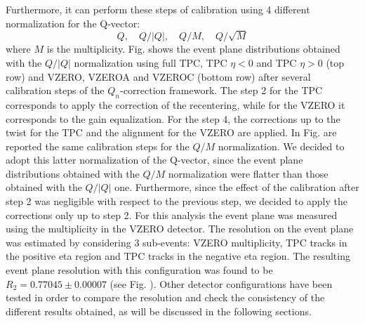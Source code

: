 Furthermore, it can perform these steps of calibration using 4 different normalization for the Q-vector:
\begin{equation}
Q, \quad Q/|Q|, \quad Q/M, \quad Q/\sqrt{M}
\end{equation}
where $M$ is the multiplicity.
Fig.  shows the event plane
distributions obtained with the $Q/|Q|$ normalization using full TPC, TPC $\eta<0$ and TPC $\eta>0$ (top row) and VZERO, VZEROA and VZEROC (bottom row) after several calibration steps of the $Q_n$-correction framework. The step 2 for the TPC  corresponds to apply the correction of the recentering, while for the VZERO it corresponds to the gain equalization. For the step 4, the corrections up to the twist for the TPC and the alignment for the VZERO are applied. In Fig. are reported the same calibration steps for the $Q/M$ normalization. We decided to adopt this latter normalization of the Q-vector, since the event plane distributions obtained with the $Q/M$ normalization were flatter than those obtained with the $Q/|Q|$ one. Furthermore, since the effect of the calibration after step 2 was negligible with respect to the previous step, we decided to apply the corrections only up to step 2.
For this analysis the event plane was measured using the multiplicity in the VZERO detector. The resolution on the event plane was estimated by considering 3 sub-events: VZERO multiplicity, TPC tracks in the positive eta region and TPC tracks in the negative eta region. The resulting event plane resolution with this configuration was found to be $R_2 = 0.77045 \pm 0.00007$ (see Fig. ). Other detector configurations have been tested in order to compare the resolution and check the consistency of the different results obtained, as will be discussed in the following sections.

